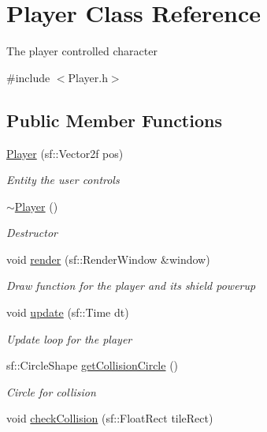 \hypertarget{class_player}{}\section{Player Class Reference}
\label{class_player}


The player controlled character  




{\ttfamily \#include $<$Player.\+h$>$}

\subsection*{Public Member Functions}
\begin{DoxyCompactItemize}
\item 
\mbox{\hyperlink{class_player_a590f9fa9624d8734027fa2b290fa909e}{Player}} (sf\+::\+Vector2f pos)
\begin{DoxyCompactList}\small\item\em Entity the user controls \end{DoxyCompactList}\item 
\mbox{\hyperlink{class_player_a749d2c00e1fe0f5c2746f7505a58c062}{$\sim$\+Player}} ()
\begin{DoxyCompactList}\small\item\em Destructor \end{DoxyCompactList}\item 
void \mbox{\hyperlink{class_player_a53938857e80374e79726309e78d1c15c}{render}} (sf\+::\+Render\+Window \&window)
\begin{DoxyCompactList}\small\item\em Draw function for the player and its shield powerup \end{DoxyCompactList}\item 
void \mbox{\hyperlink{class_player_aef595f7b4ef7419815b79e80ea0ea0b8}{update}} (sf\+::\+Time dt)
\begin{DoxyCompactList}\small\item\em Update loop for the player \end{DoxyCompactList}\item 
sf\+::\+Circle\+Shape \mbox{\hyperlink{class_player_a961473d7916a7e8c47ae1752ba6498bc}{get\+Collision\+Circle}} ()
\begin{DoxyCompactList}\small\item\em Circle for collision \end{DoxyCompactList}\item 
void \mbox{\hyperlink{class_player_a80d38f6cc31168b3a10fad95396baa46}{check\+Collision}} (sf\+::\+Float\+Rect tile\+Rect)

\end{DoxyCompactItemize}
